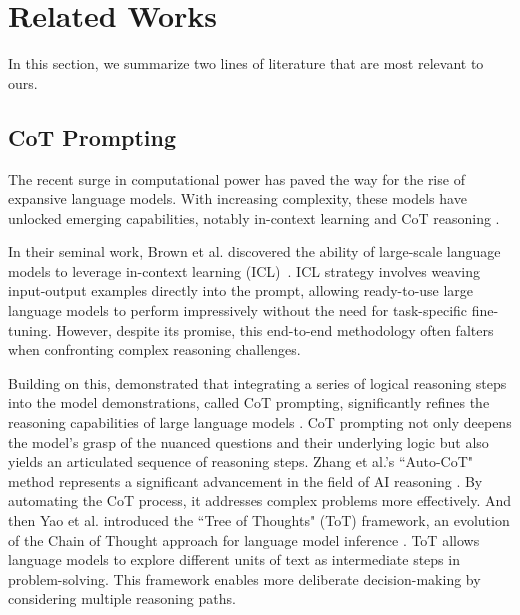 \section{Related Works}
In this section, we summarize two lines of literature that are most relevant to ours.

\subsection{CoT Prompting}
The recent surge in computational power has paved the way for the rise of expansive language models. With increasing complexity, these models have unlocked emerging capabilities, notably in-context learning and CoT reasoning \cite{wei2022chain,brown2020language,schaeffer2023emergent}.

In their seminal work, Brown et al. discovered the ability of large-scale language models to leverage in-context learning (ICL)~\cite{brown2020language}. ICL strategy involves weaving input-output examples directly into the prompt, allowing ready-to-use large language models to perform impressively without the need for task-specific fine-tuning. However, despite its promise, this end-to-end methodology often falters when confronting complex reasoning challenges.

Building on this, \citeauthor{wei2022chain} demonstrated that integrating a series of logical reasoning steps into the model demonstrations, called CoT prompting, significantly refines the reasoning capabilities of large language models \cite{wei2022chain}. CoT prompting not only deepens the model's grasp of the nuanced questions and their underlying logic but also yields an articulated sequence of reasoning steps. Zhang et al.'s ``Auto-CoT" method represents a significant advancement in the field of AI reasoning \cite{zhang2022automatic}. By automating the CoT process, it addresses complex problems more effectively.
%
And then Yao et al. introduced the ``Tree of Thoughts" (ToT) framework, an evolution of the Chain of Thought approach for language model inference \cite{yao2023tree}. ToT allows language models to explore different units of text as intermediate steps in problem-solving. This framework enables more deliberate decision-making by considering multiple reasoning paths.
%

